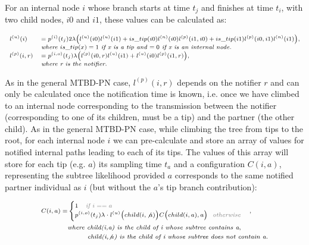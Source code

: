 \documentclass[a4paper,10pt]{article}
\begin{document}
For an internal node $i$ whose branch starts at time $t_j$ and finishes at time $t_i$, with two child nodes, $i0$ and $i1$, these values can be calculated as:

\begin{equation}
\scriptsize
\begin{array}{ll}
l^{(u)}(i) &= p^{(i)}(t_j) 2\lambda 
\Big(l^{(u)}(i0)l^{(u)}(i1) 
+ is\_tip(i0) l^{(n)}(i0)l^{(p)}(i1,i0)
+ is\_tip(i1) l^{(p)}(i0,i1)l^{(n)}(i1)\Big),\\
& \textit{where } is\_tip(x) = 1 \textit{ if x is a tip and $= 0$ if x is an internal node.}\\
l^{(p)}(i, r) &= p^{(i,o)}(t_j) \lambda\Big(l^{(p)}(i0,r)l^{(u)}(i1) + l^{(u)}(i0)l^{(p)}(i1,r)\Big),\\
& \textit{where r is the notifier.}\\
\end{array}
\end{equation}

As in the general MTBD-PN case, $l^{(p)}(i, r)$ depends on the notifier $r$ and can only be calculated once the notification time is known, i.e. once we have climbed to an internal node corresponding to the transmission between the notifier (corresponding to one of its children, must be a tip) and the partner (the other child). As in the general MTBD-PN case, while climbing the tree from tips to the root, for each internal node $i$ we can pre-calculate and store an array of values for notified internal paths leading to each of its tips. The values of this array will store for each tip (e.g. $a$) its sampling time $t_a$ and a configuration $C(i,a)$, representing the subtree likelihood provided $a$ corresponds to the same notified partner individual as $i$ (but without the $a$'s tip branch contribution): 

\begin{equation}
\scriptsize
\begin{split}
C(i,a) = &\begin{cases}
1 \textit{\color{gray}~~~if $i == a$}
\\
p^{(i,o)}(t_j) \lambda \cdot l^{(u)}\Big(child(i, \not a)\Big)C\Big(child(i, a),a\Big) \textit{\color{gray}~~otherwise}\\ 
\end{cases},
\\ &\textit{where child(i,a) is the child of i whose subtree contains a},
\\
 &\textit{~~~~~~~~child(i,$\not a$) is the child of i whose subtree does not contain a.}
\end{split}
\end{equation}
\end{document}

